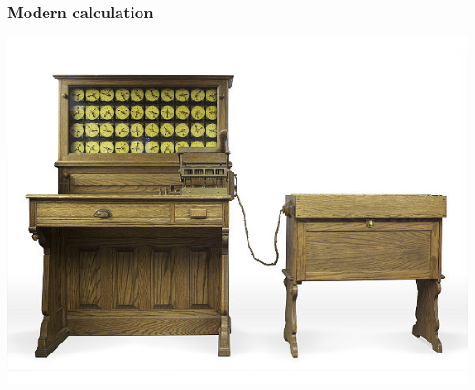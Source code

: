 \documentclass[11pt]{beamer}
\begin{document}








\begin{frame}[fragile]
  \frametitle{Modern calculation}

  \includegraphics[height=0.75\textheight]{./img/ibm.jpg}
\end{frame}
\end{document}
